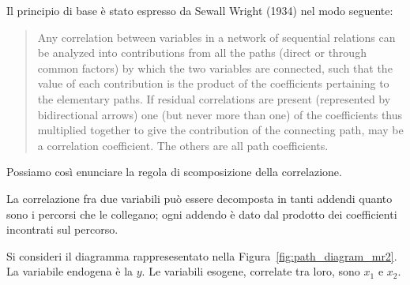 Il principio di base è stato espresso da Sewall Wright (1934) nel modo
seguente: 

\begin{quote}
Any correlation between variables in a network of
  sequential relations can be analyzed into contributions from all the
  paths (direct or through common factors) by which the two variables
  are connected, such that the value of each contribution is the
  product of the coefficients pertaining to the elementary paths. If
  residual correlations are present (represented by bidirectional
  arrows) one (but never more than one) of the coefficients thus
  multiplied together to give the contribution of the connecting path,
  may be a correlation coefficient. The others are all path
  coefficients.
\end{quote}
Possiamo così enunciare la regola di scomposizione della correlazione.
\begin{defn}
La correlazione fra due variabili può essere decomposta in tanti addendi quanto sono i percorsi che le collegano; 
ogni addendo è dato dal prodotto dei coefficienti incontrati sul percorso. 
\end{defn}

Si consideri il diagramma rappresesentato nella Figura~\ref{fig:path_diagram_mr2}. 
La variabile endogena è la $y$. Le variabili esogene, correlate tra loro, sono $x_1$ e $x_2$. 


